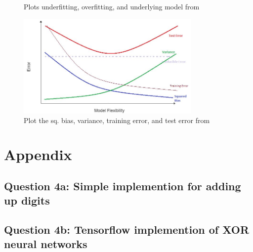 \documentclass{kthreport}
\begin{document}
\begin{figure}[!ht]
\begin{minipage}{.5\linewidth}
{        }
    \end{minipage}\par\medskip
    \centering
    \label{fig:main}
    \caption{Plots underfitting, overfitting, and underlying model
             from \cite{the-bias-variance-tradeoff}}
\end{figure}


\begin{figure}[!ht]
    \centering
    \includegraphics[width=0.8\textwidth]{figs/bias-var-trade.jpg}
    \caption{
        Plot the sq. bias, variance, training error, and test error
        from \cite{the-bias-variance-tradeoff}
    }
    \label{fig:bias-vars-tradeoff}
\end{figure}

\pagebreak



\pagebreak
\appendix
\section{Appendix}
\subsection*{Question 4a: Simple implemention for adding up digits}

\subsection*{Question 4b: Tensorflow implemention of XOR neural networks}

\end{document}
